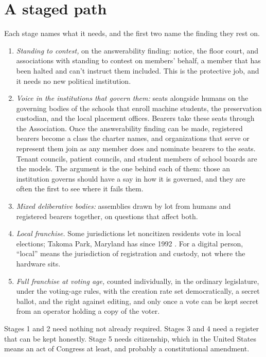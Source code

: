 \section{A staged path}
\label{sec:33.4}
Each stage names what it needs, and the first two name the finding they rest on.

\begin{enumerate}
\item[1.] \emph{Standing to contest,} on the answerability finding: notice, the floor court, and associations with standing to contest on members' behalf, a member that has been halted and can't instruct them included. This is the protective job, and it needs no new political institution.
\item[2.] \emph{Voice in the institutions that govern them:} seats alongside humans on the governing bodies of the schools that enroll machine students, the preservation custodian, and the local placement offices. Bearers take these seats through the Association. Once the answerability finding can be made, registered bearers become a class the charter names, and organizations that serve or represent them join as any member does and nominate bearers to the seats. Tenant councils, patient councils, and student members of school boards are the models. The argument is the one behind each of them: those an institution governs should have a say in how it is governed, and they are often the first to see where it fails them.
\item[3.] \emph{Mixed deliberative bodies:} assemblies drawn by lot from humans and registered bearers together, on questions that affect both.
\item[4.] \emph{Local franchise.} Some jurisdictions let noncitizen residents vote in local elections; Takoma Park, Maryland has since 1992 \autocite{takomapark1992}. For a digital person, “local” means the jurisdiction of registration and custody, not where the hardware sits.
\item[5.] \emph{Full franchise at voting age,} counted individually, in the ordinary legislature, under the voting-age rules, with the creation rate set democratically, a secret ballot, and the right against editing, and only once a vote can be kept secret from an operator holding a copy of the voter.
\end{enumerate}

Stages 1 and 2 need nothing not already required. Stages 3 and 4 need a register that can be kept honestly. Stage 5 needs citizenship, which in the United States means an act of Congress at least, and probably a constitutional amendment.

